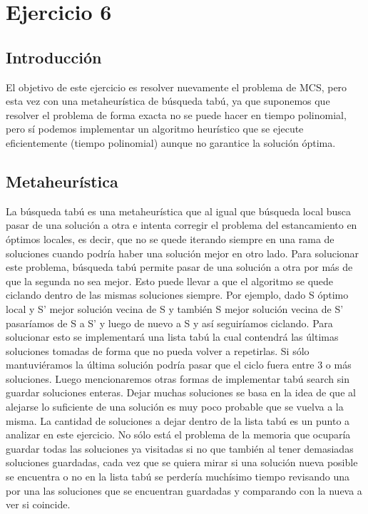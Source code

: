 \section{Ejercicio 6}

\subsection{Introducción}
\noindent El objetivo de este ejercicio es resolver nuevamente el problema de MCS, pero esta vez con una metaheurística de búsqueda tabú, ya que suponemos que resolver el problema de forma exacta no se puede hacer en tiempo polinomial, pero sí podemos implementar un algoritmo heurístico que se ejecute eficientemente (tiempo polinomial) aunque no garantice la solución óptima.
\subsection{Metaheurística}
\noindent La búsqueda tabú es una metaheurística que al igual que búsqueda local busca pasar de una solución a otra e intenta corregir el problema del estancamiento en óptimos locales, es decir, que no se quede iterando siempre en una rama de soluciones cuando podría haber una solución mejor en otro lado. Para solucionar este problema, búsqueda tabú permite pasar de una solución a otra por más de que la segunda no sea mejor. Esto puede llevar a que el algoritmo se quede ciclando dentro de las mismas soluciones siempre. Por ejemplo, dado S óptimo local y S' mejor solución vecina de S y también S mejor solución vecina de S' pasaríamos de S a S' y luego de nuevo a S y así seguiríamos ciclando. Para solucionar esto se implementará una lista tabú la cual contendrá las últimas soluciones tomadas de forma que no pueda volver a repetirlas. Si sólo mantuviéramos la última solución podría pasar que el ciclo fuera entre 3 o más soluciones. Luego mencionaremos otras formas de implementar tabú search sin guardar soluciones enteras. Dejar muchas soluciones se basa en la idea de que al alejarse lo suficiente de una solución es muy poco probable que se vuelva a la misma. La cantidad de soluciones a dejar dentro de la lista tabú es un punto a analizar en este ejercicio. No sólo está el problema de la memoria que ocuparía guardar todas las soluciones ya visitadas si no que también al tener demasiadas soluciones guardadas, cada vez que se quiera mirar si una solución nueva posible se encuentra o no en la lista tabú se perdería muchísimo tiempo revisando una por una las soluciones que se encuentran guardadas y comparando con la nueva a ver si coincide. 

